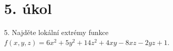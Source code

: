 \section{5. úkol}
  5. Najděte lokální extrémy funkce $f(x,y,z) = 6x^2 + 5y^2 + 14z^2 + 4xy - 8xz - 2yz +1$.
